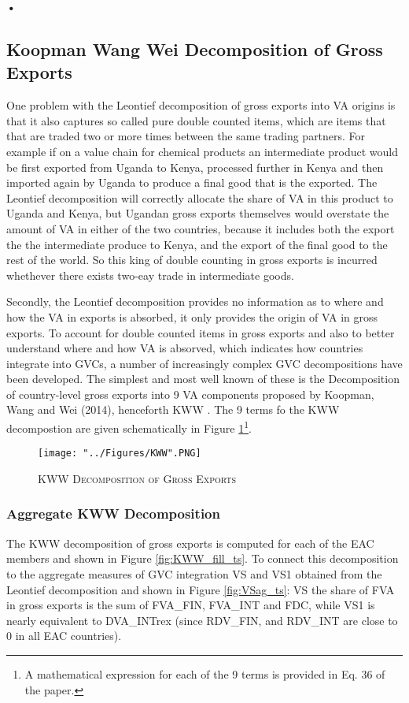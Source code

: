 \textbf{\textbf{•}}\documentclass[a4paper]{article}
\begin{document}
\subsection{Koopman Wang Wei Decomposition of Gross Exports}
One problem with the Leontief decomposition of gross exports into VA origins is that it also captures so called pure double counted items, which are items that that are traded two or more times between the same trading partners. For example if on a value chain for chemical products an intermediate product would be first exported from Uganda to Kenya, processed further in Kenya and then imported again by Uganda to produce a final good that is the exported. The Leontief decomposition will correctly allocate the share of VA in this product to Uganda and Kenya, but Ugandan gross exports themselves would overstate the amount of VA in either of the two countries, because it includes both the export the the intermediate produce to Kenya, and the export of the final good to the rest of the world. So this king of double counting in gross exports is incurred whethever there exists two-eay trade in intermediate goods. \newline

Secondly, the Leontief decomposition provides no information as to where and how the VA in exports is absorbed, it only provides the origin of VA in gross exports. To account for double counted items in gross exports and also to better understand where and how VA is absorved, which indicates how countries integrate into GVCs, a number of increasingly complex GVC decompositions have been developed. The simplest and most well known of these is the Decomposition of country-level gross exports into 9 VA components proposed by Koopman, Wang and Wei (2014), henceforth KWW \citep{koopman2014tracing}. The 9 terms fo the KWW decompostion are given schematically in Figure \ref{fig:KWW}\footnote{A mathematical expression for each of the 9 terms is provided in Eq. 36 of the \citet{koopman2014tracing} paper.}.

\begin{figure}[h!]
\centering
\caption{\label{fig:KWW}\textsc{KWW Decomposition of Gross Exports}}
\texttt{[image: "../Figures/KWW".PNG]} %
\end{figure}
\FloatBarrier

\subsubsection{Aggregate KWW Decomposition}
The KWW decomposition of gross exports is computed for each of the EAC members and shown in Figure \ref{fig:KWW_fill_ts}. To connect this decomposition to the aggregate measures of GVC integration VS and VS1 obtained from the Leontief decomposition and shown in Figure \ref{fig:VSag_ts}: VS the share of FVA in gross exports is the sum of FVA\_FIN, FVA\_INT  and FDC, while VS1 is nearly equivalent to DVA\_INTrex (since RDV\_FIN, and RDV\_INT are close to 0 in all EAC countries).  
\end{document}
